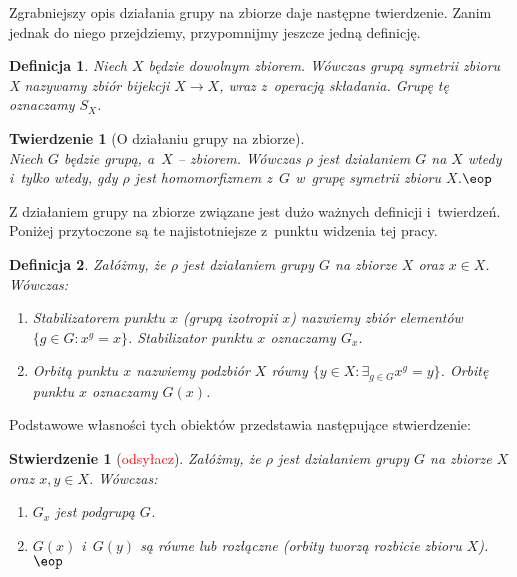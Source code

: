 \documentclass[licencjacka]{pracamgr}
\newtheorem{deff}{Definicja}[section]
\newtheorem{thh}{Twierdzenie}[section]
\newtheorem{fact}{Stwierdzenie}[section]
\begin{document}
Zgrabniejszy opis działania grupy na zbiorze daje następne
twierdzenie. Zanim jednak do niego przejdziemy, przypomnijmy
jeszcze jedną definicję.

\begin{deff}
    Niech $X$ będzie dowolnym zbiorem. Wówczas \emph{grupą symetrii zbioru X} nazywamy zbiór bijekcji $X \to X$,
    wraz z~operacją składania. Grupę tę oznaczamy $S_X$.
\end{deff}

\begin{thh}[O działaniu grupy na zbiorze] $ $ \\
    Niech $G$ będzie grupą, a~$X$ -- zbiorem. Wówczas $\rho$ jest działaniem $G$ na $X$ wtedy i~tylko wtedy,
    gdy $\rho$ jest homomorfizmem z~$G$ w~grupę symetrii zbioru $X$.\quad$\eop$
\end{thh}

Z działaniem grupy na zbiorze związane jest dużo ważnych definicji
i~twierdzeń. Poniżej przytoczone są te najistotniejsze z~punktu
widzenia tej pracy.

\begin{deff}
    Załóżmy, że $\rho$ jest działaniem grupy $G$ na zbiorze $X$ oraz $x \in X$. Wówczas:
    \begin{enumerate}[label=\alph*)]
     \item \emph{Stabilizatorem punktu $x$ (grupą izotropii $x$)} nazwiemy zbiór elementów $\{g \in G\colon x^g = x \}$.
                    Stabilizator punktu $x$ oznaczamy $G_x$.
     \item \emph{Orbitą punktu $x$} nazwiemy podzbiór $X$ równy $\{y \in X \colon \exists_{g \in G} x^g = y \}$.
                    Orbitę punktu $x$ oznaczamy $G(x)$.
    \end{enumerate}
\end{deff}

Podstawowe własności tych obiektów przedstawia następujące stwierdzenie:
\begin{fact} [\textcolor{red}{odsyłacz}]
    Załóżmy, że $\rho$ jest działaniem grupy $G$ na zbiorze $X$ oraz $x, y \in X$. Wówczas:
    \begin{enumerate}[label=\alph*)]
     \item $G_x$ jest podgrupą $G$.
     \item $G(x)$ i~$G(y)$ są równe lub rozłączne (orbity tworzą rozbicie zbioru $X$).\quad$\eop$
    \end{enumerate}
\end{fact}
\end{document}
